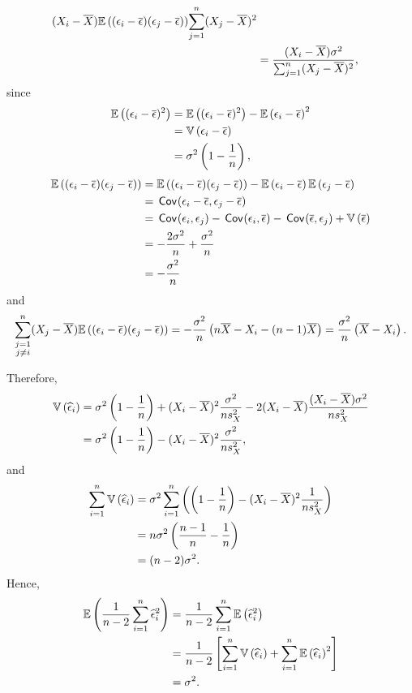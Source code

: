 \begin{ex}
\begin{align*}
{      (X_i-\overline{X})\mathbb{E}\left((\epsilon_i-\overline{\epsilon})(\epsilon_j-\overline{\epsilon})\right)
    }{\sum_{j=1}^n(X_j-\overline{X})^2}                               \\
     & =\frac{(X_i-\overline{X})\sigma^2}{\sum_{j=1}^n(X_j-\overline{X})^2},
  \end{align*}
  since
  \begin{align*}
    \mathbb{E}\left((\epsilon_i-\overline{\epsilon})^2\right)
     & =\mathbb{E}\left((\epsilon_i-\overline{\epsilon})^2\right)
    -\mathbb{E}\left(\epsilon_i-\overline{\epsilon}\right)^2               \\
     & =\mathbb{V}\left(\epsilon_i-\overline{\epsilon}\right)            \\
     & =\sigma^2\left(1-\frac{1}{n}\right),
  \end{align*}
  \begin{align*}
    \mathbb{E}\left((\epsilon_i-\overline{\epsilon})(\epsilon_j-\overline{\epsilon})\right)
     & =\mathbb{E}\left((\epsilon_i-\overline{\epsilon})(\epsilon_j-\overline{\epsilon})\right)
    -\mathbb{E}\left(\epsilon_i-\overline{\epsilon}\right)\mathbb{E}\left(\epsilon_j-\overline{\epsilon}\right)    \\
     & =\,\textsf{Cov}\mkern-2mu\left(\epsilon_i-\overline{\epsilon},\epsilon_j-\overline{\epsilon} \right)  \\
     & =\,\textsf{Cov}\mkern-2mu\left(\epsilon_i,\epsilon_j \right)
    -\,\textsf{Cov}\mkern-2mu\left(\epsilon_i,\overline{\epsilon} \right)
    -\,\textsf{Cov}\mkern-2mu\left(\overline{\epsilon},\epsilon_j \right)
    +\mathbb{V}\left(\overline{\epsilon}\right)                                   \\
     & =-\frac{2\sigma^2}{n}+\frac{\sigma^2}{n}      \\
     & =-\frac{\sigma^2}{n}
  \end{align*}
  and
  \[
    \sum_{\substack{j=1                                       \\ j\neq i}}^n
    (X_j-\overline{X})\mathbb{E}\left((\epsilon_i-\overline{\epsilon})(\epsilon_j-\overline{\epsilon})\right)
    =-\frac{\sigma^2}{n}\left(n\overline{X}-X_i-(n-1)\overline{X}\right)
    =\frac{\sigma^2}{n}\left(\overline{X}-X_i\right).
  \]

  Therefore,
  \begin{align*}
    \mathbb{V}\left(\widehat{\epsilon}_i\right)
     & =\sigma^2\left(1-\frac{1}{n}\right)
    +(X_i-\overline{X})^2\frac{\sigma^2}{ns_X^2}
    -2(X_i-\overline{X})\frac{(X_i-\overline{X})\sigma^2}{ns_X^2} \\
     & =\sigma^2\left(1-\frac{1}{n}\right)
    -(X_i-\overline{X})^2\frac{\sigma^2}{ns_X^2},
  \end{align*}
  and
  \begin{align*}
    \sum_{i=1}^n\mathbb{V}\left(\widehat{\epsilon}_i\right)
     & =\sigma^2\sum_{i=1}^n\left(
    \left(1-\frac{1}{n}\right)
    -(X_i-\overline{X})^2\frac{1}{ns_X^2}
    \right)                                             \\
     & =n\sigma^2\left(\frac{n-1}{n}-\frac{1}{n}\right) \\
     & =(n-2)\sigma^2.
  \end{align*}
  Hence,
  \begin{align*}
    \mathbb{E}\left(\frac{1}{n-2}\sum_{i=1}^n\widehat{\epsilon}_i^2\right)
     & =\frac{1}{n-2}\sum_{i=1}^n\mathbb{E}\left(\widehat{\epsilon}_i^2\right)                                                     \\
     & =\frac{1}{n-2}\left[\sum_{i=1}^n\mathbb{V}\left(\widehat{\epsilon}_i\right)+\sum_{i=1}^n\mathbb{E}\left(\widehat{\epsilon}_i\right)^2\right] \\
     & =\sigma^2.
  \end{align*}
\end{ex}

